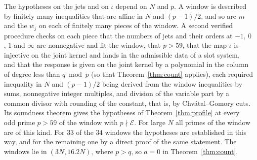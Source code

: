 The hypotheses on the jets and on $\iota$ depend on $N$ and $p$. A window is described by finitely many
inequalities that are affine in $N$ and $(p-1)/2$, and so are $m$ and the $w_j$ on each of finitely many
pieces of the window. A second verified procedure checks on each piece that the numbers of jets and their
orders at $-1$, $0$, $1$ and $\infty$ are nonnegative and fit the window, that $p>59$, that the map $\iota$
is injective on the joint kernel and lands in the admissible data of a slot system, and that the response is
given on the joint kernel by a polynomial in the column of degree less than $q \bmod p$ (so that
Theorem~\ref{thm:count} applies), each required inequality in $N$ and $(p-1)/2$ being derived from the
window inequalities by sums, nonnegative integer multiples, and division of the variable part by a common
divisor with rounding of the constant, that is, by Chv\'atal--Gomory cuts. Its soundness theorem gives the
hypotheses of Theorem~\ref{thm:profile} at every odd prime $p>59$ of the window with $p\nmid\mathcal E$.
For large $N$ all primes of the window are of this kind. For $33$ of the $34$ windows the hypotheses are
established in this way, and for the remaining one by a direct proof of the same statement. The windows
lie in $(3N,16.2N)$, where $p>q$, so $a=0$ in Theorem~\ref{thm:count}.

